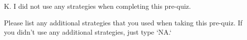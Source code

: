 \documentclass{ximera}
\begin{document}
\begin{question}
\begin{question}
    \begin{multipleChoice}
    \end{multipleChoice}
    
\end{question}
\begin{question}    
    
    K. I did not use any strategies when completing this pre-quiz.

    \begin{multipleChoice}
    \end{multipleChoice}

\end{question}
\end{question}


\begin{question}
    Please list any additional strategies that you used when taking this pre-quiz. If you didn't use any additional strategies, just type `NA.`
   \begin{freeResponse}
   \end{freeResponse}
\end{question}



%
\end{document}
